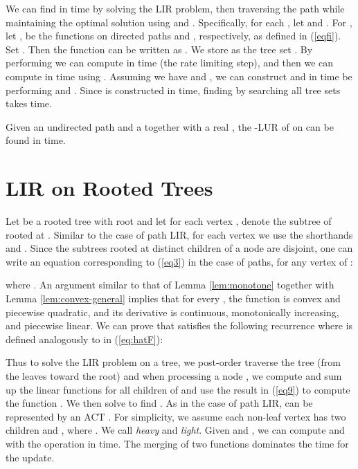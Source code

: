 \documentclass[11pt]{article}
\begin{document}
We can find  in  time by solving the LIR problem, then traversing the path while maintaining the optimal solution using  and .  Specifically,
for each , let  and . 
For , let ,  be the functions on directed paths  and , respectively, as defined in (\ref{eqfi}).  Set .  Then the function  can be written as .  We store  as the tree set .  
By performing  we can compute  in  time (the rate limiting step), and then we can compute  in  time using .  
Assuming we have  and , we can construct  and  in  time be performing 
 and 
.  
Since  is constructed 
in  time, finding  by searching all  tree sets 
takes  time.


\begin{theorem}
Given an undirected path  and a  together with a real , the
-LUR of  on  can be found in  time.
\end{theorem}



\section{LIR on Rooted Trees} \label{sec:treelir} 

Let  be a rooted tree with root  and let for each vertex ,  denote the subtree of  rooted at . Similar to the case of path LIR, for each vertex  we use the shorthands  and . Since the subtrees rooted at distinct children of a node  are disjoint, 
one can  write an equation corresponding to (\ref{eq3}) in the case of paths, for any vertex  of :

where .
An argument similar to that of Lemma \ref{lem:monotone} together with Lemma \ref{lem:convex-general} implies that 
for every , the function  is convex and piecewise quadratic, and its derivative  is continuous, monotonically increasing, and piecewise linear.
We can prove that  satisfies the following recurrence where  is defined analogously to  in (\ref{eq:hatF}): 



Thus to solve the LIR problem on a tree, we post-order traverse the tree (from the leaves toward the root) and when processing a node , we compute and sum up the linear functions  for all children  of  and use the result in (\ref{eq9}) to compute the function . We then solve  to find . As in the case of path LIR,  can be represented by an ACT . For simplicity, we assume each non-leaf vertex  has two children  and , where .  We call  \emph{heavy} and  \emph{light}.  Given  and , we can compute  and  with the operation  in  time.  The merging of two functions dominates the time for the update.
\end{document}
